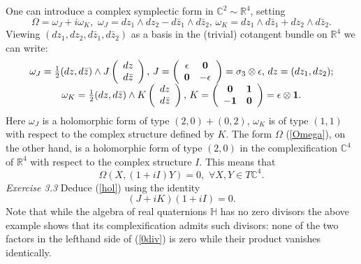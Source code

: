 One can introduce a complex symplectic form in ${\mathbb C}^2 \sim{\mathbb R}^4$, setting
\begin{equation}
\label{Omega}
\Omega = \omega_J + i\omega_K, \, \, \omega_J = dz_1\wedge dz_2 - d{\bar z}_1\wedge d{\bar z}_2,
\, \omega_K = dz_1\wedge d{\bar z}_1 + dz_2\wedge d{\bar z}_2. 
\end{equation}
{\footnotesize Viewing $(dz_1, dz_2, d{\bar z}_1, d{\bar z}_2)$ as a basis in the (trivial) cotangent bundle 
on ${\mathbb R}^4$ we can write:}
\begin{equation}
\label{JK}
\begin{array}{c}
\omega_J =\frac{1}{2} (dz, d{\bar z})\wedge J \left( 
\begin{array}{c}
dz \\ d{\bar z}
\end{array}
\right) ,
\, J =\left( 
\begin{array}{cc}
\epsilon & {\bf 0} \\
{\bf 0} & -\epsilon
\end{array}
\right) = \sigma_3 \otimes \epsilon, \, dz = (dz_1, dz_2);\\
 \omega_K =\frac{1}{2} (dz, d{\bar z})\wedge K \left( 
\begin{array}{c}
dz \\ d{\bar z}
\end{array}
\right) , \, K =\left( 
\begin{array}{cc}
{\bf 0} & {\bf 1} \\
-{\bf 1} & {\bf 0}
\end{array}
\right) = \epsilon \otimes {\bf 1}.
\end{array}
\end{equation}
Here $\omega_J$ is a holomorphic form of type $(2, 0) + (0,2)$, $\omega_K$ is of
 type $(1,1)$ with respect to the complex structure defined by $K$. The form 
$\Omega$ (\ref{Omega}), on the other hand, is a holomorphic form of type 
$(2, 0)$ in the complexification ${\mathbb C}^4$ of ${\mathbb R}^4$ with respect
 to the complex structure $I$. This means that 
\begin{equation}
\label{hol}
\Omega(X, (1+i I)Y) = 0,  \, \, \forall X, Y \in T{\mathbb C}^4.
\end{equation}
{\it Exercise 3.3} Deduce (\ref{hol}) using the identity
\begin{equation}
\label{0div}
(J + i K)(1 + i I) = 0.
\end{equation}
Note that while the algebra of real quaternions $\mathbb H$
has no zero divisors the above example shows that its complexification admits
such divisors: none of the two factors in the lefthand side of (\ref{0div}) is 
zero while their product vanishes identically.

